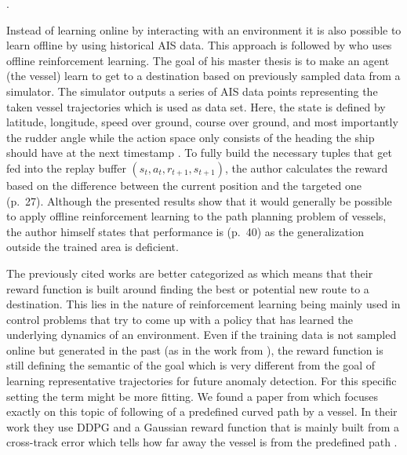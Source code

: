 \cite[pp.~21-26]{s20020426}.
\par 
Instead of learning online by interacting with an environment it is also possible to learn offline by using historical AIS data. This approach is followed by \cite{westerlund2021learning} who uses offline reinforcement learning. The goal of his master thesis is to make an agent (the vessel) learn to get to a destination based on previously sampled data from a simulator. The simulator outputs a series of AIS data points representing the taken vessel trajectories which is used as data set. Here, the state is defined by latitude, longitude, speed over ground, course over ground, and most importantly the rudder angle while the action space only consists of the heading the ship should have at the next timestamp \cite[pp.~30-33]{westerlund2021learning}. To fully build the necessary tuples that get fed into the replay buffer $(s_t, a_t, r_{t+1}, s_{t+1})$, the author calculates the reward based on the difference between the current position and the targeted one (p.~27). Although the presented results show that it would generally be possible to apply offline reinforcement learning to the path planning problem of vessels, the author himself states that performance is (p.~40) as the generalization outside the trained area is deficient.
\par
The previously cited works are better categorized as  which means that their reward function is built around finding the best or potential new route to a destination. This lies in the nature of reinforcement learning being mainly used in control problems that try to come up with a policy that has learned the underlying dynamics of an environment. Even if the training data is not sampled online but generated in the past (as in the work  from \cite{westerlund2021learning}), the reward function is still defining the semantic of the goal which is very different from the goal of learning representative trajectories for future anomaly detection. For this specific setting the term  might be more fitting. We found a paper from \cite{martinsen2018curved} which focuses exactly on this topic of following of a predefined curved path by a vessel. In their work they use DDPG and a Gaussian reward function that is mainly built from a cross-track error which tells how far away the vessel is from the predefined path \cite[p.~3]{martinsen2018curved}. 